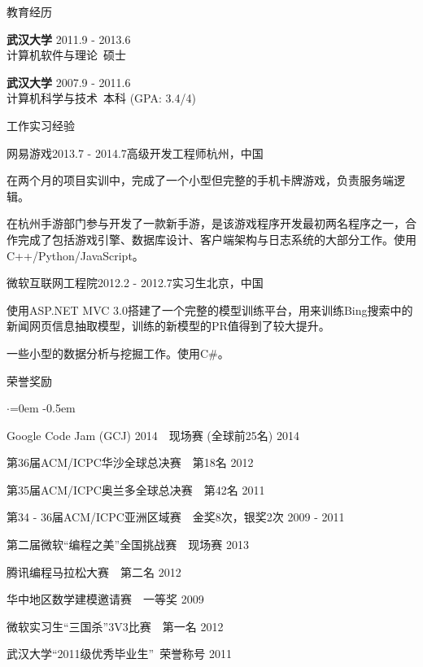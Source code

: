 \documentclass{resume} %
\begin{document}
\begin{rSection}{教育经历}

{\bf 武汉大学} \hfill {2011.9 - 2013.6} \\
计算机软件与理论\ 硕士

{\bf 武汉大学} \hfill {2007.9 - 2011.6} \\
计算机科学与技术\ 本科 (GPA: 3.4/4)
\vspace{0.5em}

\end{rSection}

\begin{rSection}{工作实习经验}

\begin{rSubsection}{网易游戏}{2013.7 - 2014.7}{高级开发工程师}{杭州，中国}
\item 在两个月的项目实训中，完成了一个小型但完整的手机卡牌游戏，负责服务端逻辑。
\item 在杭州手游部门参与开发了一款新手游，是该游戏程序开发最初两名程序之一，合作完成了包括游戏引擎、数据库设计、客户端架构与日志系统的大部分工作。使用C++/Python/JavaScript。
\end{rSubsection}
\begin{rSubsection}{微软互联网工程院}{2012.2 - 2012.7}{实习生}{北京，中国}
\item 使用ASP.NET MVC 3.0搭建了一个完整的模型训练平台，用来训练Bing搜索中的新闻网页信息抽取模型，训练的新模型的PR值得到了较大提升。
\item 一些小型的数据分析与挖掘工作。使用C\#。
\end{rSubsection}

\end{rSection}

\begin{rSection}{荣誉奖励}
\begin{list}{$\cdot$}{\leftmargin=0em}
\itemsep -0.5em \vspace{0em}
\item Google Code Jam (GCJ) 2014~~现场赛 (全球前25名)  \hfill {2014}
\item 第36届ACM/ICPC华沙全球总决赛~~第18名  \hfill {2012}
\item 第35届ACM/ICPC奥兰多全球总决赛~~第42名  \hfill {2011}
\item 第34 - 36届ACM/ICPC亚洲区域赛~~金奖8次，银奖2次 \hfill {2009 - 2011}
\item 第二届微软“编程之美”全国挑战赛~~现场赛 \hfill {2013}
\item 腾讯编程马拉松大赛~~第二名 \hfill {2012}
\item 华中地区数学建模邀请赛~~一等奖 \hfill {2009}
\item 微软实习生“三国杀”3V3比赛~~第一名 \hfill {2012}  %
\item 武汉大学“2011级优秀毕业生”\ 荣誉称号 \hfill {2011}
\end{list}
\vspace{0.5em}

\end{rSection}
\end{document}
